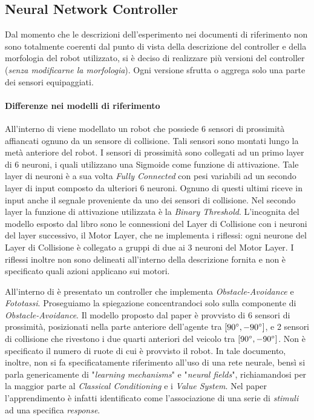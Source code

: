 \newpage

\subsection{Neural Network Controller}\label{lab:ANN}

Dal momento che le descrizioni dell'esperimento nei documenti di riferimento \cite{pfeifer2001understanding, verschure1992distributed} non sono totalmente coerenti dal punto di vista della descrizione del controller e della morfologia del robot utilizzato, si è deciso di realizzare più versioni del controller (\textit{senza modificarne la morfologia}). Ogni versione sfrutta o aggrega solo una parte dei sensori equipaggiati.

\paragraph{Differenze nei modelli di riferimento}
All'interno di \cite{pfeifer2001understanding} viene modellato un robot che possiede 6 sensori di prossimità affiancati ognuno da un sensore di collisione. Tali sensori sono montati lungo la metà anteriore del robot. I sensori di prossimità sono collegati ad un primo layer di 6 neuroni, i quali utilizzano una Sigmoide come funzione di attivazione. Tale layer di neuroni è a sua volta \textit{Fully Connected} con pesi variabili ad un secondo layer di input composto da ulteriori 6 neuroni. Ognuno di questi ultimi riceve in input anche il segnale proveniente da uno dei sensori di collisione. Nel secondo layer la funzione di attivazione utilizzata è la \textit{Binary Threshold}. L'incognita del modello esposto dal libro sono le connessioni del Layer di Collisione con i neuroni del layer successivo, il Motor Layer, che ne implementa i riflessi: ogni neurone del Layer di Collisione è collegato a gruppi di due ai 3 neuroni del Motor Layer. I riflessi inoltre non sono delineati all'interno della descrizione fornita e non è specificato quali azioni applicano sui motori. 


All'interno di \cite{verschure1992distributed} è presentato un controller che implementa \textit{Obstacle-Avoidance} e \textit{Fototassi}. Proseguiamo la spiegazione concentrandoci solo sulla componente di \textit{Obstacle-Avoidance}. 
Il modello proposto dal paper è provvisto di 6 sensori di prossimità, posizionati nella parte anteriore dell'agente tra $[90\degree,-90\degree]$, e 2 sensori di collisione che rivestono i due quarti anteriori del veicolo tra $[90\degree,-90\degree]$. Non è specificato il numero di ruote di cui è provvisto il robot.
In tale documento, inoltre, non si fa specificatamente riferimento all'uso di una rete neurale, bensì si parla genericamente di "\textit{learning mechanisms}" e "\textit{neural fields}", richiamandosi per la maggior parte al \textit{Classical Conditioning} e i \textit{Value System}. Nel paper l'apprendimento è infatti identificato come l'associazione di una serie di \textit{stimuli} ad una specifica \textit{response}. 

